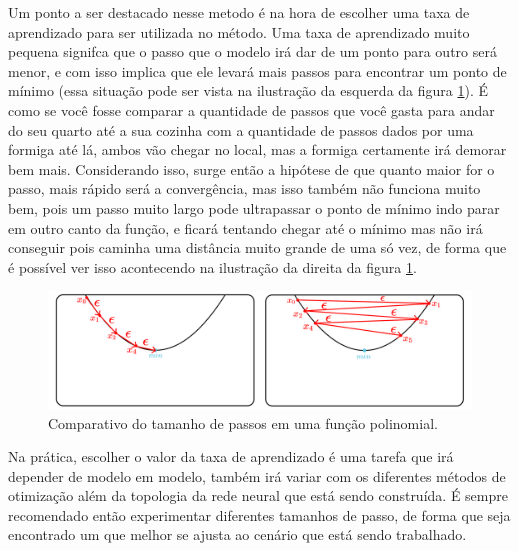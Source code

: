 Um ponto a ser destacado nesse metodo é na hora de escolher uma taxa de aprendizado para ser utilizada no método. Uma taxa de aprendizado muito pequena signifca que o passo que o modelo irá dar de um ponto para outro será menor, e com isso implica que ele levará mais passos para encontrar um ponto de mínimo (essa situação pode ser vista na ilustração da esquerda da figura \ref{fig:comparativo-tamanho-do-passo}). É como se você fosse comparar a quantidade de passos que você gasta para andar do seu quarto até a sua cozinha com a quantidade de passos dados por uma formiga até lá, ambos vão chegar no local, mas a formiga certamente irá demorar bem mais. Considerando isso, surge então a hipótese de que quanto maior for o passo, mais rápido será a convergência, mas isso também não funciona muito bem, pois um passo muito largo pode ultrapassar o ponto de mínimo indo parar em outro canto da função, e ficará tentando chegar até o mínimo mas não irá conseguir pois caminha uma distância muito grande de uma só vez, de forma que é possível ver isso acontecendo na ilustração da direita da figura \ref{fig:comparativo-tamanho-do-passo}.

\begin{figure}[h!]
    \centering
    \includegraphics[width=1\linewidth]{../imagens/retropropagacao-gradiente/comparativo-de-passos.png}
    \caption{Comparativo do tamanho de passos em uma função polinomial.}
    \label{fig:comparativo-tamanho-do-passo}
\end{figure}

Na prática, escolher o valor da taxa de aprendizado é uma tarefa que irá depender de modelo em modelo, também irá variar com os diferentes métodos de otimização além da topologia da rede neural que está sendo construída. É sempre recomendado então experimentar diferentes tamanhos de passo, de forma que seja encontrado um que melhor se ajusta ao cenário que está sendo trabalhado.

